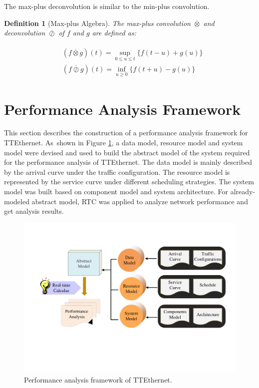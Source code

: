 \documentclass[electronics,article,accept,moreauthors,pdftex]{Definitions/mdpi}
\newtheorem{myDef}{Definition}
\begin{document}
The max-plus deconvolution is similar to the min-plus convolution.

\begin{myDef}[Max-plus Algebra]
The max-plus convolution $\overline{\otimes}$ and deconvolution $\overline{\oslash}$ of $f$ and $g$ are defined as:

\begin{gather}
\begin{align}
    &(f\overline{\otimes} g)(t) = \sup_{0 \leq u \leq t}\{f(t-u)+g(u)\}\\
 	&(f\overline{\oslash} g)(t) = \inf_{u \ge 0}\{f(t+u)-g(u)\}
\end{align}
\end{gather}
\end{myDef}

\section{Performance Analysis Framework}
\label{per}

This section describes the construction of a performance analysis framework for TTEthernet. As~shown in {Figure} \ref{framework}, a data model, resource model and system model were devised and used to build the abstract model of the system required for the performance analysis of TTEthernet. The data model is mainly described by the arrival curve under the traffic configuration. The resource model is represented by the service curve under different scheduling strategies. The system model was built based on component model and system architecture. For already-modeled abstract model, RTC was applied to analyze network performance and get analysis results.

\begin{figure}[H]
\centering
\includegraphics [scale=0.4] {figures/framework}
\caption{Performance analysis framework of TTEthernet.}
\label{framework}
\end{figure}
\end{document}
